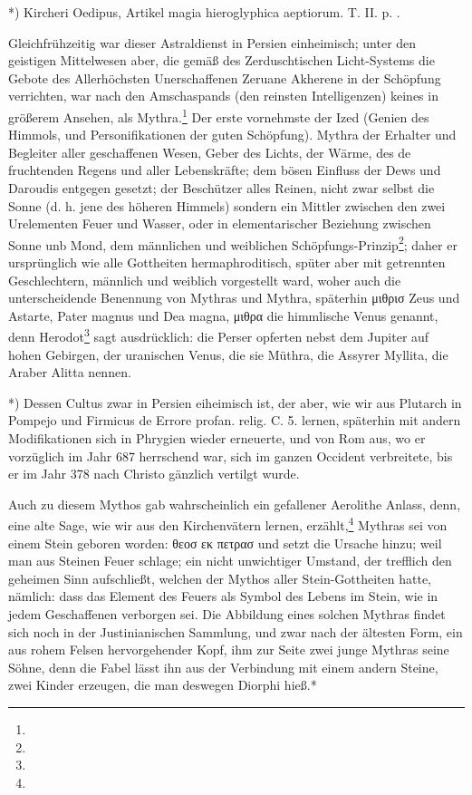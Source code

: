 \documentclass[a4paper, 11pt, oneside, polutonikogreek, german]{article}
\begin{document}
*) Kircheri Oedipus, Artikel magia hieroglyphica aeptiorum. T. II. p. .

Gleichfrühzeitig war dieser Astraldienst in Persien einheimisch; unter den geistigen Mittelwesen aber, die gemäß des Zerduschtischen Licht-Systems die Gebote des Allerhöchsten Unerschaffenen Zeruane Akherene in der Schöpfung verrichten, war nach den Amschaspands (den reinsten Intelligenzen) keines in größerem Ansehen, als Mythra.\footnote{} Der erste vornehmste der Ized (Genien des Himmols, und Personifikationen der guten Schöpfung). Mythra der Erhalter und Begleiter aller geschaffenen Wesen, Geber des Lichts, der Wärme, des de fruchtenden Regens und aller Lebenskräfte; dem bösen Einfluss der Dews und Daroudis entgegen gesetzt; der Beschützer alles Reinen, nicht zwar selbst die Sonne (d. h. jene des höheren Himmels) sondern ein Mittler zwischen den zwei Urelementen Feuer und Wasser, oder in elementarischer Beziehung zwischen Sonne unb Mond, dem männlichen und weiblichen Schöpfungs-Prinzip\footnote{}; daher er ursprünglich wie alle Gottheiten hermaphroditisch, spüter aber mit getrennten Geschlechtern, männlich und weiblich vorgestellt ward, woher auch die unterscheidende Benennung von Mythras und Mythra, späterhin μιθρισ Zeus und Astarte, Pater magnus und Dea magna, μιθρα die himmlische Venus genannt, denn Herodot\footnote{} sagt ausdrücklich: die Perser opferten nebst dem Jupiter auf hohen Gebirgen, der uranischen Venus, die sie Müthra, die Assyrer Myllita, die Araber Alitta nennen.

*) Dessen Cultus zwar in Persien eiheimisch ist, der aber, wie wir aus Plutarch in Pompejo und Firmicus de Errore profan. relig. C. 5. lernen, späterhin mit andern Modifikationen sich in Phrygien wieder erneuerte, und von Rom aus, wo er vorzüglich im Jahr 687 herrschend war, sich im ganzen Occident verbreitete, bis er im Jahr 378 nach Christo gänzlich vertilgt wurde.

Auch zu diesem Mythos gab wahrscheinlich ein gefallener Aerolithe Anlass, denn, eine alte Sage, wie wir aus den Kirchenvätern lernen, erzählt,\footnote{} Mythras sei von einem Stein geboren worden: θεοσ εκ πετρασ und setzt die Ursache hinzu; weil man aus Steinen Feuer schlage; ein nicht unwichtiger Umstand, der trefflich den geheimen Sinn aufschließt, welchen der Mythos aller Stein-Gottheiten hatte, nämlich: dass das Element des Feuers als Symbol des Lebens im Stein, wie in jedem Geschaffenen verborgen sei. Die Abbildung eines solchen Mythras findet sich noch in der Justinianischen Sammlung, und zwar nach der ältesten Form, ein aus rohem Felsen hervorgehender Kopf, ihm zur Seite zwei junge Mythras seine Söhne, denn die Fabel lässt ihn aus der Verbindung mit einem andern Steine, zwei Kinder erzeugen, die man deswegen Diorphi hieß.*
\end{document}
